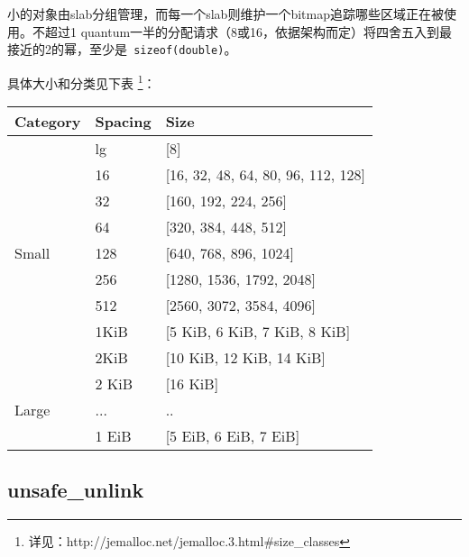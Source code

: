 小的对象由slab分组管理，而每一个slab则维护一个bitmap追踪哪些区域正在被使用。不超过1 quantum一半的分配请求（8或16，依据架构而定）将四舍五入到最接近的2的幂，至少是\verb+ sizeof(double)+。

具体大小和分类见下表 \footnote{详见：http://jemalloc.net/jemalloc.3.html\#size\_classes}：
\begin{table}[]
\centering
\begin{tabular}{|l|l|l|}
\hline
\multicolumn{1}{|c|}{Category} & Spacing & Size                                   \\ \hline
\multirow{9}{*}{Small}               & lg      & {[}8{]}                                \\ \cline{2-3} 
                               & 16      & {[}16, 32, 48, 64, 80, 96, 112, 128{]} \\ \cline{2-3} 
                               & 32      & {[}160, 192, 224, 256{]}               \\ \cline{2-3} 
                               & 64      & {[}320, 384, 448, 512{]}               \\ \cline{2-3} 
                               & 128     & {[}640, 768, 896, 1024{]}              \\ \cline{2-3} 
                               & 256     & {[}1280, 1536, 1792, 2048{]}           \\ \cline{2-3} 
                               & 512     & {[}2560, 3072, 3584, 4096{]}           \\ \cline{2-3} 
                               & 1KiB    & {[}5 KiB, 6 KiB, 7 KiB, 8 KiB{]}       \\ \cline{2-3} 
                               & 2KiB    & {[}10 KiB, 12 KiB, 14 KiB{]}           \\ \hline
\multirow{3}{*}{Large}               & 2 KiB   & {[}16 KiB{]}                           \\ \cline{2-3} 
                               & ...     & ..                                     \\ \cline{2-3} 
                               & 1 EiB   & {[}5 EiB, 6 EiB, 7 EiB{]}              \\ \hline
\end{tabular}
\end{table}


\subsection{unsafe\_unlink}

